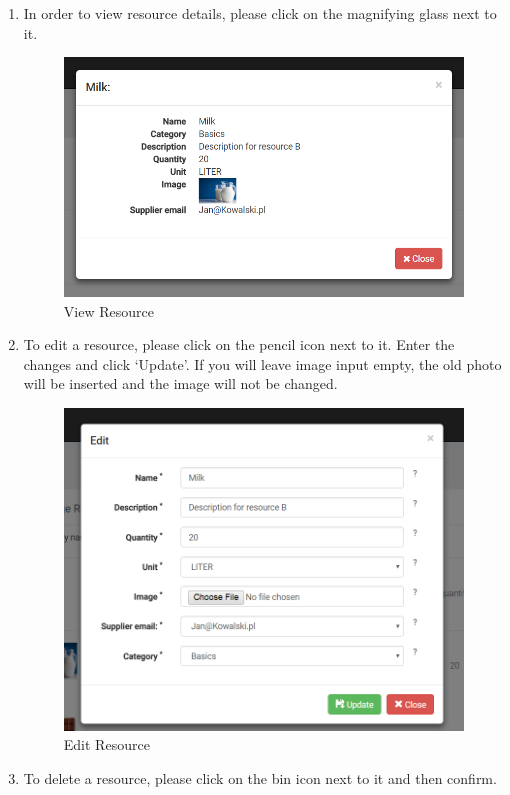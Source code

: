 \documentclass[a4paper,11pt,twoside]{report}
\theoremstyle{definition}
\begin{document}
\begin{enumerate}
\item In order to view resource details, please click on the magnifying glass next to it.

\begin{figure}[h!]
\begin{center}
\includegraphics[width=\textwidth]{AS/resources/3}
\end{center}
\caption{View Resource}
\end{figure}
\thispagestyle{empty}

\item To edit a resource, please click on the pencil icon next to it. Enter the changes and click ‘Update’. If you will leave image input empty, the old photo will be inserted and the image will not be changed.

\begin{figure}[h!]
\begin{center}
\includegraphics[width=\textwidth]{AS/resources/4}
\end{center}
\caption{Edit Resource}
\end{figure}
\thispagestyle{empty}

\item To delete a resource, please click on the bin icon next to it and then confirm.
\end{enumerate}
\end{document}
